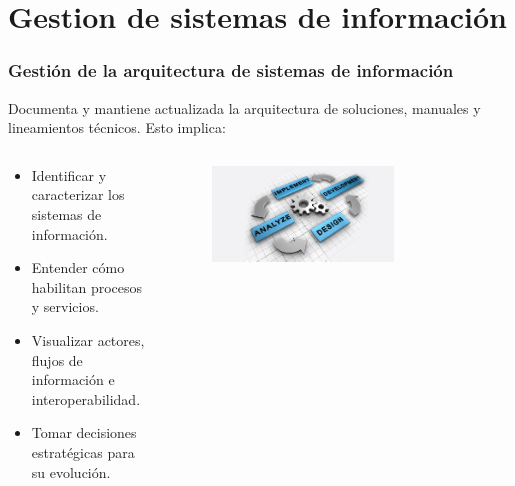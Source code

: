 \section{Gestion de sistemas de información}

\insertsectionpage



\begin{frame}
	
   \frametitle{}
\end{frame}


\begin{frame}

  \frametitle{Gestión de la arquitectura de sistemas de información}

  Documenta y mantiene actualizada la arquitectura de soluciones, manuales y lineamientos técnicos. Esto implica:
  \begin{columns}
    \begin{column}{.5\textwidth}
      \begin{itemize}	
        \item Identificar y caracterizar los sistemas de información.
        \item Entender cómo habilitan procesos y servicios.
        \item Visualizar actores, flujos de información e interoperabilidad.
        \item Tomar decisiones estratégicas para su evolución.
      \end{itemize}
    \end{column}

    \begin{column}{.5\textwidth}
      \begin{figure}[ht]
        \centering
        \includegraphics[width=0.7\textwidth]{img/arquitectura.jpg}
      \end{figure}
    \end{column}
  \end{columns}
  

\end{frame} 
